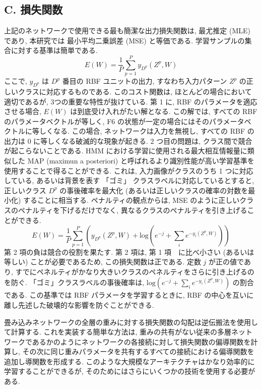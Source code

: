 \documentclass[twocolumn]{jarticle}     %
\begin{document}
\subsection*{C. 損失関数}
上記のネットワークで使用できる最も簡潔な出力損失関数は, 最尤推定 (MLE) であり, 本研究では 最小平均二乗誤差 (MSE) と等価である.
学習サンプルの集合に対する基準は簡単である.
\begin{equation}
  E(W) = \frac{1}{P}\sum_{p=1}^{P}y_{D^p}(Z^p,W)
\end{equation}
ここで, $y_{D^p}$ は $D^p$ 番目の RBF ユニットの出力, すなわち入力パターン $Z^p$ の正しいクラスに対応するものである.
このコスト関数は, ほとんどの場合において適切であるが, 3つの重要な特性が抜けている. 
第 1 に, RBF のパラメータを適応させる場合, $E(W)$ は到底受け入れがたい解となる. この解では, すべての RBF のパラメータベクトルが等しく, F6 の状態が一定の場合にはそのパラメータベクトルに等しくなる.
この場合, ネットワークは入力を無視し, すべての RBF の出力は 0 に等しくなる破滅的な現象が起きる.
 2 つ目の問題は, クラス間で競合が起こらないことである. HMM における学習に使用される最大相互情報量に類似した MAP (maximun a posteriori) と呼ばれるより識別性能が高い学習基準を使用することで得ることができる.
 これは, 入力画像がクラスのうち 1 つに対応している, あるいは背景を表す 「ゴミ」 クラスラベルに対応しているとすると, 正しいクラス $D^p$ の事後確率を最大化 (あるいは正しいクラスの確率の対数を最小化) することに相当する.
 ペナルティの観点からは, MSE のように正しいクラスのペナルティを下げるだけでなく, 異なるクラスのペナルティを引き上げることができる.
 \begin{equation}
  E(W) = \frac{1}{P} \sum_{p=1}^P (y_{D^p}(Z^p,W) + \mathrm{log}(e^{-j} + \sum_{i}e^{-y_i(Z^p,W)}))
 \end{equation}
 第 2 項の負は競合の役割を果たす.
 第 2 項は, 第 1 項　に比べ小さい (あるいは等しい) ことが必要であるため, この損失関数は正である.
 定数 $j$ が正の値であり, すでにペネルティがかなり大きいクラスのペネルティをさらに引き上げるのを防ぐ.
 「ゴミ」クラスラベルの事後確率は, $\mathrm{log}(e^{-j} + \sum_{i}e^{-y_i(Z^p,W)})$ の割合である.
 この基準では RBF パラメータを学習するときに, RBF の中心を互いに離し先述した破壊的な影響を防ぐことができる.
 \par
 畳み込みネットワークの全層の重みに対する損失関数の勾配は逆伝搬法を使用して計算する.
 これを実装する簡単な方法は, 重みの共有がない従来の多層ネットワークであるかのようにネットワークの各接続に対して損失関数の偏導関数を計算し, その次に同じ重みパラメータを共有するすべての接続における偏導関数を追加し導関数を形成する.
 このような大規模なアーキテクチャはかなり効率的に学習することができるが, そのためにはさらにいくつかの技術を使用する必要がある. 
\end{document}
